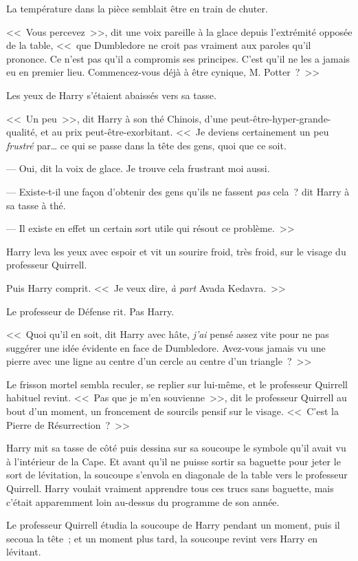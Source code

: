 La température dans la pièce semblait être en train de chuter.

<<~Vous percevez~>>, dit une voix pareille à la glace depuis l'extrémité opposée de la table, <<~que Dumbledore ne croit pas vraiment aux paroles qu'il prononce. Ce n'est pas qu'il a compromis ses principes. C'est qu'il ne les a jamais eu en premier lieu. Commencez-vous déjà à être cynique, M. Potter~?~>>

Les yeux de Harry s'étaient abaissés vers sa tasse.

<<~Un peu~>>, dit Harry à son thé Chinois, d'une peut-être-hyper-grande-qualité, et au prix peut-être-exorbitant. <<~Je deviens certainement un peu \emph{frustré} par… ce qui se passe dans la tête des gens, quoi que ce soit.

--- Oui, dit la voix de glace. Je trouve cela frustrant moi aussi.

--- Existe-t-il une façon d'obtenir des gens qu'ils ne fassent \emph{pas} cela~? dit Harry à sa tasse à thé.

--- Il existe en effet un certain sort utile qui résout ce problème.~>>

Harry leva les yeux avec espoir et vit un sourire froid, très froid, sur le visage du professeur Quirrell.

Puis Harry comprit. <<~Je veux dire, \emph{à part} Avada Kedavra.~>>

Le professeur de Défense rit. Pas Harry.

<<~Quoi qu'il en soit, dit Harry avec hâte, \emph{j'ai} pensé assez vite pour ne pas suggérer une idée évidente en face de Dumbledore. Avez-vous jamais vu une pierre avec une ligne au centre d'un cercle au centre d'un triangle~?~>>

Le frisson mortel sembla reculer, se replier sur lui-même, et le professeur Quirrell habituel revint. <<~Pas que je m'en souvienne~>>, dit le professeur Quirrell au bout d'un moment, un froncement de sourcils pensif sur le visage. <<~C'est la Pierre de Résurrection~?~>>

Harry mit sa tasse de côté puis dessina sur sa soucoupe le symbole qu'il avait vu à l'intérieur de la Cape. Et avant qu'il ne puisse sortir sa baguette pour jeter le sort de lévitation, la soucoupe s'envola en diagonale de la table vers le professeur Quirrell. Harry voulait vraiment apprendre tous ces trucs sans baguette, mais c'était apparemment loin au-dessus du programme de son année.

Le professeur Quirrell étudia la soucoupe de Harry pendant un moment, puis il secoua la tête~; et un moment plus tard, la soucoupe revint vers Harry en lévitant.

